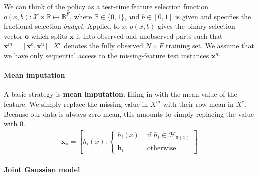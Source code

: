 We can think of the policy as a test-time feature selection function $o(x, b): \mathcal{X} \times \mathbb{R} \mapsto \mathbb{B}^F$, where $\mathbb{B} \in \{0, 1\}$, and $b \in [0, 1]$ is given and specifies the fractional selection \emph{budget}.
Applied to $x$, $o(x, b)$ gives the binary selection vector $\mathbf{o}$ which splits $\mathbf{x}$ it into observed and unobserved parts such that $\mathbf{x}^m = [\mathbf{x}^\text{o}, \mathbf{x}^\text{u}]$.
$X^c$ denotes the fully observed $N \times F$ training set.
We assume that we have only sequential access to the missing-feature test instances $\mathbf{x}^m$.

\paragraph{Mean imputation}

A basic strategy is \textbf{mean imputation}: filling in with the mean value of the feature.
We simply replace the missing value in $X^m$ with their row mean in $X^c$.
Because our data is always zero-mean, this amounts to simply replacing the value with $0$.
\begin{align}
\mathbf{x}_\pi = \left[ h_i(x) : \left\{ \begin{array}{rl}
 h_i(x) &\mbox{ if $h_i \in \mathcal{H}_{\pi(x)}$} \\
 \bar{\mathbf{h}}_i &\mbox{ otherwise}
\end{array} \right. \right]
\end{align}

\paragraph{Joint Gaussian model}

